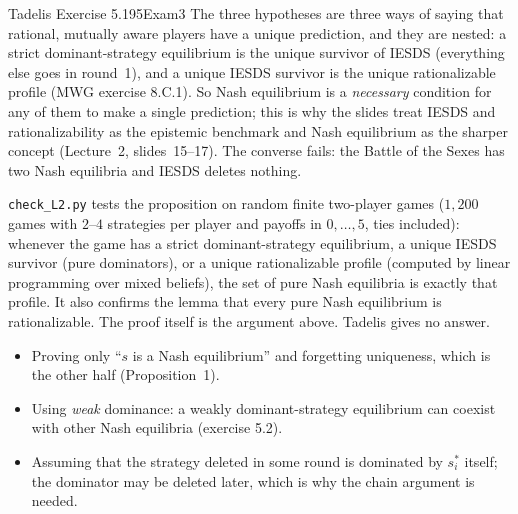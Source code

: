 \begin{exsol}{Tadelis Exercise 5.1}{95}{Exam}{3}
\interp The three hypotheses are three ways of saying that rational, mutually aware players have a
unique prediction, and they are nested: a strict dominant-strategy equilibrium is the unique
survivor of IESDS (everything else goes in round~1), and a unique IESDS survivor is the unique
rationalizable profile (MWG exercise 8.C.1). So Nash equilibrium is a \emph{necessary} condition for
any of them to make a single prediction; this is why the slides treat IESDS and rationalizability as
the epistemic benchmark and Nash equilibrium as the sharper concept (Lecture~2, slides~15--17). The
converse fails: the Battle of the Sexes has two Nash equilibria and IESDS deletes nothing.

\verify \texttt{check\_L2.py} tests the proposition on random finite two-player games ($1{,}200$
games with $2$--$4$ strategies per player and payoffs in $0,\dots,5$, ties included): whenever the
game has a strict dominant-strategy equilibrium, a unique IESDS survivor (pure dominators), or a
unique rationalizable profile (computed by linear programming over mixed beliefs), the set of pure
Nash equilibria is exactly that profile. It also confirms the lemma that every pure Nash equilibrium
is rationalizable. The proof itself is the argument above. Tadelis gives no answer.

\mistakes
\begin{itemize}
  \item Proving only ``$s$ is a Nash equilibrium'' and forgetting uniqueness, which is the other
  half (Proposition~1).
  \item Using \emph{weak} dominance: a weakly dominant-strategy equilibrium can coexist with other
  Nash equilibria (exercise 5.2).
  \item Assuming that the strategy deleted in some round is dominated by $s_i^*$ itself; the dominator
  may be deleted later, which is why the chain argument is needed.
\end{itemize}
\end{exsol}

